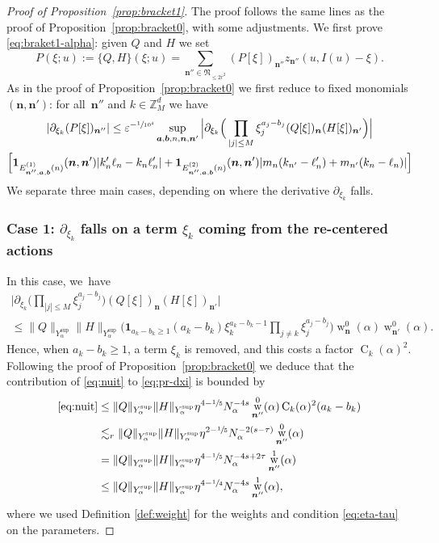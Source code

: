 \documentclass[JEP,XML,SOM,Unicode,published]{cedram}
\DeclareMathOperator{\rw}{w}
\theoremstyle{plain}
\theoremstyle{definition}
\newcommand{\nb}{{\boldsymbol n}}
\newcommand{\Nb}{{\boldsymbol{\mathfrak{N}}}}
\newcommand{\Z}{\mathbb{Z}}
\newcommand{\1}{\mathbf{1}}
\newcommand{\Ysup}[1]{Y_{#1}^{\mathrm{sup}}}
\let\epsilon\varepsilon
\begin{document}
\begin{proof}[Proof of Proposition~\ref{prop:bracket1}] The proof follows the same lines as the proof of Proposition~\ref{prop:bracket0}, with some adjustments.
We first prove \eqref{eq:braket1-alpha}: given $Q$ and $ H$ we set
\[
P(\xi;u) := \{Q,H\}(\xi;u) = \sum_{\nb''\in\Nb_{\leq2\overline{r}^{2}}}(P[\xi])_{\nb''}z_{\nb''}(u,I(u)-\xi).
\]
As in the proof of Proposition~\ref{prop:bracket0} we first reduce to fixed monomials $(\nb,\nb')$: for all~$\nb''$ and $k\in\Z_{M}^{d}$ we have
\begin{multline}
|\partial_{\xi_{k}}(P[\xi])_{\nb''}|
\leq \epsilon^{-\sfrac{1}{10^{4}}}\sup_{\boldsymbol{a},\boldsymbol{b},n,\nb,\nb'}
\Big|
\partial_{\xi_{k}}
\Big(\prod_{|j|\leq M}\xi_{j}^{a_{j}-b_{j}}
(Q[\xi])_{\nb}(H[\xi])_{\nb'}
\Big)
\Big| \\
\Big[
\mathbf{1}_{E_{\nb'',\boldsymbol{a},\boldsymbol{b}}^{(1)}(n)}(\nb,\nb')|k_{n}'\ell_{n}-k_{n}\ell_{n}'|
+\mathbf{1}_{E_{\nb'',\boldsymbol{a},\boldsymbol{b}}^{(2)}(n)}(\nb,\nb')
|m_{n}(k_{n'}-\ell_{n}')+m_{n'}(k_{n}-\ell_{n})|
\Big]
\label{eq:pr-dxi}
\end{multline}
We separate three main cases, depending on where the derivative $\partial_{\xi_{k}}$ falls.

\subsubsection*{Case 1: $\partial_{\xi_{k}}$ falls on a term $\xi_{k}$ coming from the re-centered actions}
In this case, we~have
\begin{multline}
\Big|
\partial_{\xi_{k}}
\Big(
\prod_{|j|\leq M}\xi_{j}^{a_{j}-b_{j}}
\Big)
(Q[\xi])_{\nb}(H[\xi])_{\nb'}
\Big| \\
\leq
\|Q\|_{\Ysup{\alpha}}\|H\|_{\Ysup{\alpha}}
\Big(
\mathbf{1}_{a_{k}-b_{k}\geq1}(a_{k}-b_{k})\xi_{k}^{a_{k}-b_{k}-1}
\prod_{j\neq k}\xi_{j}^{a_{j}-b_{j}}\Big)
\rw_{\nb}^{0}(\alpha)
\rw_{\nb'}^{0}(\alpha).
\label{eq:nuit}
\end{multline}
Hence, when $a_{k}-b_{k}\geq1$, a term $\xi_{k}$ is removed, and this costs a factor $\operatorname{C}_{k}(\alpha)^{2}$. Following the proof of Proposition~\ref{prop:bracket0} we deduce that the contribution of \eqref{eq:nuit} to \eqref{eq:pr-dxi} is bounded by
\begin{align*}
\eqref{eq:nuit}
&\leq
\|Q\|_{\Ysup{\alpha}}\|H\|_{\Ysup{\alpha}}
\eta^{4-\sfrac{1}{5}}N_{\alpha}^{-4s}
\rw_{\nb''}^{0}(\alpha)
\operatorname{C}_{k}(\alpha)^{2}
(a_{k}-b_{k})
\\
&\lesssim_{r}
\|Q\|_{\Ysup{\alpha}}\|H\|_{\Ysup{\alpha}}
\eta^{2-\sfrac{1}{5}}N_{\alpha}^{-2(s-\tau)}
\rw_{\nb''}^{0}(\alpha)
\\
&=
\|Q\|_{\Ysup{\alpha}}\|H\|_{\Ysup{\alpha}}
\eta^{4-\sfrac{1}{5}}N_{\alpha}^{-4s+2\tau}
\rw_{\nb''}^{1}(\alpha)
\\
&\leq
\|Q\|_{\Ysup{\alpha}}\|H\|_{\Ysup{\alpha}}
\eta^{4-\sfrac{1}{4}}N_{\alpha}^{-4s}\rw_{\nb''}^{1}(\alpha),
\end{align*}
where we used Definition \ref{def:weight} for the weights and condition \eqref{eq:eta-tau} on the parameters.


\end{proof}
\end{document}
